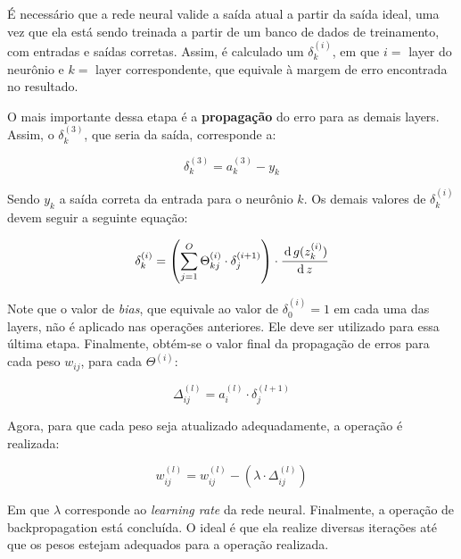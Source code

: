             É necessário que a rede neural valide a saída atual a partir da saída ideal, uma vez que ela está sendo treinada a partir de um banco de dados de treinamento, com entradas e saídas corretas. Assim, é calculado um $\delta^{(i)}_k$, em que $i =$ layer do neurônio e $k =$ layer correspondente, que equivale à margem de erro encontrada no resultado.

            O mais importante dessa etapa é a \textbf{propagação} do erro para as demais layers. Assim, o $\delta^{(3)}_k$, que seria da saída, corresponde a:

            \begin{equation}
                \delta^{(3)}_k = a^{(3)}_k - y_k
            \end{equation}

            Sendo $y_k$ a saída correta da entrada para o neurônio $k$. Os demais valores de $\delta^{(i)}_k$ devem seguir a seguinte equação:

            \begin{equation}
                \delta^{(i)}_k = \left(\sum_{j = 1}^O \Theta^{(i)}_{kj} \cdot \delta^{(i + 1)}_{j}\right) \cdot \cfrac{\operatorname{d} g(z^{(i)}_k)}{\operatorname{d} z}
            \end{equation}

            Note que o valor de \textit{bias}, que equivale ao valor de $\delta^{(i)}_0 = 1$ em cada uma das layers, não é aplicado nas operações anteriores. Ele deve ser utilizado para essa última etapa. Finalmente, obtém-se o valor final da propagação de erros para cada peso $w_{ij}$, para cada $\Theta^{(i)}$:

            \begin{equation}
                \Delta^{(l)}_{ij} = a^{(l)}_i \cdot \delta^{(l + 1)}_j
            \end{equation}

            Agora, para que cada peso seja atualizado adequadamente, a operação é realizada:

            \begin{equation}
                w^{(l)}_{ij} = w^{(l)}_{ij} - (\lambda \cdot \Delta^{(l)}_{ij})
            \end{equation}

            Em que $\lambda$ corresponde ao \textit{learning rate} da rede neural. Finalmente, a operação de backpropagation está concluída. O ideal é que ela realize diversas iterações até que os pesos estejam adequados para a operação realizada.

